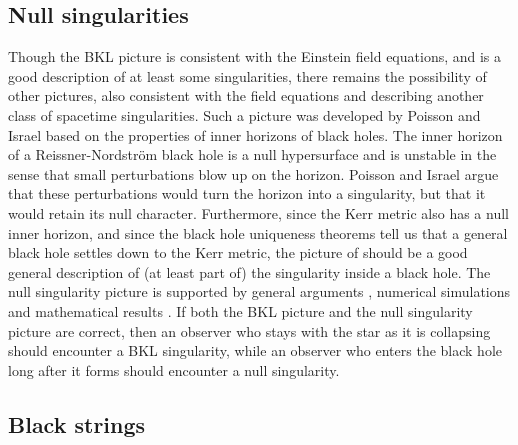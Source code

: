 \documentclass[12pt]{iopart}
\begin{document}
\subsection{Null singularities}

Though the BKL picture is consistent with the Einstein field equations, and is a good description of at least some singularities, there remains the possibility of other pictures, also consistent with the field equations and describing another class of spacetime singularities.  Such a picture was developed by Poisson and Israel \cite{ericandwerner} based on the properties of inner horizons of black holes.  The inner horizon of a Reissner-Nordstr\"om black hole is a null hypersurface and is unstable in the sense that small perturbations blow up on the horizon.  Poisson and Israel argue that these perturbations would turn the horizon into a singularity, but that it would retain its null character.  Furthermore, since the Kerr metric also has a null inner horizon, and since the black hole uniqueness theorems tell us that a general black hole settles down to the Kerr metric, the picture of \cite{ericandwerner} should be a good general description of (at least part of) the singularity inside a black hole.  The null singularity picture is supported by general arguments \cite{OF}, numerical simulations \cite{Brady} and mathematical results \cite{Daf}. If both the BKL picture and the null singularity picture are correct, then an observer who stays with the star as it is collapsing should encounter a BKL singularity, while an observer who enters the black hole long after it forms should encounter a null singularity.  

\subsection{Black strings}
\end{document}
